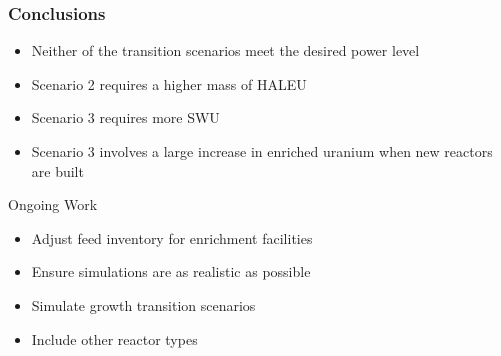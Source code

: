 \begin{frame}
\frametitle{Conclusions}
    \begin{itemize}
        \item Neither of the transition scenarios meet the desired power level
        \item Scenario 2 requires a higher mass of \gls{HALEU}
        \item Scenario 3 requires more \gls{SWU}
        \item Scenario 3 involves a large increase in enriched uranium when 
              new reactors are built
    \end{itemize}

    \begin{block}{Ongoing Work}
        \begin{itemize}
            \item Adjust feed inventory for enrichment facilities
            \item Ensure simulations are as realistic as possible
            \item Simulate growth transition scenarios
            \item Include other reactor types
        \end{itemize}
    \end{block}
    

\end{frame}